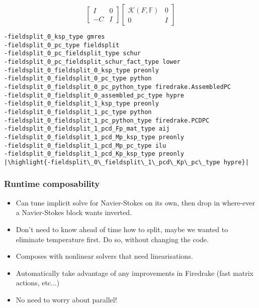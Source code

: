 \documentclass[presentation]{beamer}
\newcommand{\KSP}[2]{\ensuremath{\mathcal{K}\left(#1, \mathbb{#2}\right)}}
\newcommand{\ksp}[1]{\KSP{#1}{#1}}
\newcommand{\highlight}[1]{\colorbox{red!20}{\color{black} #1}}
\begin{document}
\begin{frame}[fragile]
\begin{onlyenv}
\begin{equation*}
      \begin{bmatrix}
        I & 0\\
        -C & I
      \end{bmatrix}
      \begin{bmatrix}
        \ksp{F} & 0 \\
        0 & I
      \end{bmatrix}
    \end{equation*}
\begin{verbatim}
-fieldsplit_0_ksp_type gmres
-fieldsplit_0_pc_type fieldsplit
-fieldsplit_0_pc_fieldsplit_type schur
-fieldsplit_0_pc_fieldsplit_schur_fact_type lower
-fieldsplit_0_fieldsplit_0_ksp_type preonly
-fieldsplit_0_fieldsplit_0_pc_type python
-fieldsplit_0_fieldsplit_0_pc_python_type firedrake.AssembledPC
-fieldsplit_0_fieldsplit_0_assembled_pc_type hypre
-fieldsplit_0_fieldsplit_1_ksp_type preonly
-fieldsplit_0_fieldsplit_1_pc_type python
-fieldsplit_0_fieldsplit_1_pc_python_type firedrake.PCDPC
-fieldsplit_0_fieldsplit_1_pcd_Fp_mat_type aij
-fieldsplit_0_fieldsplit_1_pcd_Mp_ksp_type preonly
-fieldsplit_0_fieldsplit_1_pcd_Mp_pc_type ilu
-fieldsplit_0_fieldsplit_1_pcd_Kp_ksp_type preonly
|\highlight{-fieldsplit\_0\_fieldsplit\_1\_pcd\_Kp\_pc\_type hypre}|
\end{verbatim}
  \end{onlyenv}
\end{frame}

\begin{frame}
  \frametitle{Runtime composability}

  \begin{itemize}
  \item Can tune implicit solve for Navier-Stokes on its own, then
    drop in where-ever a Navier-Stokes block wants inverted.

  \item Don't need to know ahead of time how to split, maybe we wanted to
    eliminate temperature first.  Do so, without changing the code.

  \item Composes with nonlinear solvers that need linearisations.

  \item Automatically take advantage of any improvements in Firedrake
    (fast matrix actions, etc...)

  \item No need to worry about parallel!
  \end{itemize}
\end{frame}
\end{document}
